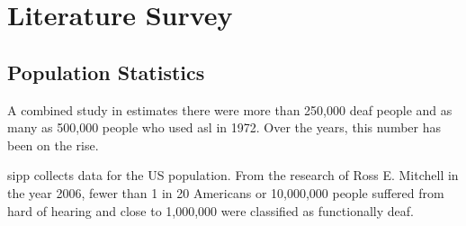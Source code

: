 \documentclass[twocolumn]{article}
\begin{document}
\section{Literature Survey}

\subsection{Population Statistics}
A combined study in \cite{mitchell2006many} estimates there were more than 
250,000 deaf people and as many as 500,000 people who used \gls{asl} in 1972. 
Over the years, this number has been on the rise.

\gls{sipp} collects data for the US population. From the research of 
Ross E. Mitchell \cite{mitchell2006many} in the year 2006, fewer than 1 in 20 
Americans or 10,000,000 people suffered from hard of hearing and close to 
1,000,000 were classified as functionally deaf.




\glsaddall
\setlength{\glsdescwidth}{0.8\textwidth}
\printglossary[type=\acronymtype,title=List Of Abbreviations]
\end{document}
